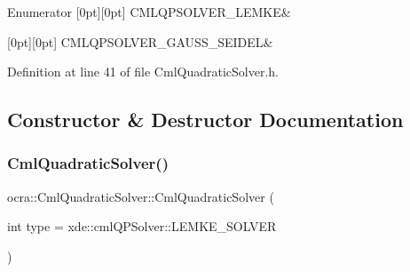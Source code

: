 \begin{DoxyEnumFields}{Enumerator}
[0pt][0pt]{}\hypertarget{classocra_1_1CmlQuadraticSolver_a6d54dc2e4dac085099b002c88cb6d3dfac7ab4857986d549d2c7ac2f4e7d834cc}{}\label{classocra_1_1CmlQuadraticSolver_a6d54dc2e4dac085099b002c88cb6d3dfac7ab4857986d549d2c7ac2f4e7d834cc} 
C\+M\+L\+Q\+P\+S\+O\+L\+V\+E\+R\+\_\+\+L\+E\+M\+KE&\\
\hline

[0pt][0pt]{}\hypertarget{classocra_1_1CmlQuadraticSolver_a6d54dc2e4dac085099b002c88cb6d3dfa53afe853cc16e5023a4618d57cb082f1}{}\label{classocra_1_1CmlQuadraticSolver_a6d54dc2e4dac085099b002c88cb6d3dfa53afe853cc16e5023a4618d57cb082f1} 
C\+M\+L\+Q\+P\+S\+O\+L\+V\+E\+R\+\_\+\+G\+A\+U\+S\+S\+\_\+\+S\+E\+I\+D\+EL&\\
\hline

\end{DoxyEnumFields}


Definition at line 41 of file Cml\+Quadratic\+Solver.\+h.



\subsection{Constructor \& Destructor Documentation}
\hypertarget{classocra_1_1CmlQuadraticSolver_a4ef339a5d511aff62bf4f6669fa894b8}{}\label{classocra_1_1CmlQuadraticSolver_a4ef339a5d511aff62bf4f6669fa894b8} 
\subsubsection{\texorpdfstring{Cml\+Quadratic\+Solver()}{CmlQuadraticSolver()}}
{\footnotesize\ttfamily ocra\+::\+Cml\+Quadratic\+Solver\+::\+Cml\+Quadratic\+Solver (\begin{DoxyParamCaption}\item[{int}]{type = {\ttfamily xde\+:\+:cmlQPSolver\+:\+:LEMKE\+\_\+SOLVER} }\end{DoxyParamCaption})}




